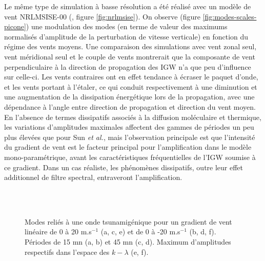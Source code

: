 Le même type de simulation à basse résolution a été réalisé avec un modèle de vent NRLMSISE-00 (\cite{Picone2002}, figure \ref{fig:nrlmsise}). On observe (figure \ref{fig:modes-scales-picone}) une modulation des modes (en terme de valeur des maximums normalisés d'amplitude de la perturbation de vitesse verticale) en fonction du régime des vents moyens. Une comparaison des simulations avec vent zonal seul, vent méridional seul et le couple de vents montrerait que la composante de vent perpendiculaire à la direction de propagation des IGW n'a que peu d'influence sur celle-ci. Les vents contraires ont en effet tendance à écraser le paquet d'onde, et les vents portant à l'étaler, ce qui conduit respectivement à une diminution et une augmentation de la dissipation énergétique lors de la propagation, avec une dépendance à l'angle entre direction de propagation et direction du vent moyen. En l'absence de termes dissipatifs associés à la diffusion moléculaire et thermique, les variations d'amplitudes maximales affectent des gammes de périodes un peu plus élevées que pour Sun \emph{et al.}, mais l'observation principale est que l'intensité du gradient de vent est le facteur principal pour l'amplification dans le modèle mono-paramétrique, avant les caractéristiques fréquentielles de l'IGW soumise à ce gradient. Dans un cas réaliste, les phénomènes dissipatifs, outre leur effet additionnel de filtre spectral, entraveront l'amplification.

\begin{figure}[!ht]
\centering
\subfigure[]{\texttt{[image: 01]}}
\subfigure[]{\texttt{[image: 03]}}\\
\subfigure[]{\texttt{[image: 02]}}
\subfigure[]{\texttt{[image: 04]}}\\
\subfigure[]{\texttt{[image: 05]}}
\subfigure[]{\texttt{[image: 06]}}
\caption{Modes reliés à une onde tsunamigénique pour un gradient de vent linéaire de 0 à 20 m.s$^{-1}$ (a, c, e) et de 0 à -20 m.s$^{-1}$ (b, d, f). Périodes de 15 mn (a, b) et 45 mn (c, d). Maximum d'amplitudes respectifs dans l'espace des $k-\lambda$ (e, f).}
\label{fig:modes-scales}
\end{figure}

